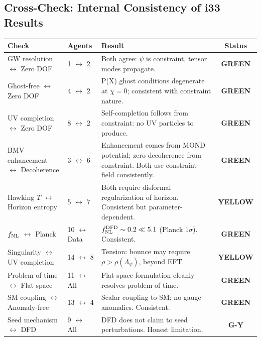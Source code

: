 \documentclass[11pt,a4paper]{article}
\newcommand{\GREEN}{\textcolor{dfdgreen}{\textbf{GREEN}}}
\newcommand{\YELLOW}{\textcolor{dfdyellow}{\textbf{YELLOW}}}
\newcommand{\GY}{\textcolor{dfdgy}{\textbf{G-Y}}}
\begin{document}
\subsection{Cross-Check: Internal Consistency of i33 Results}

\begin{center}
\begin{longtable}{p{3cm}p{2.5cm}p{5cm}c}
\toprule
\textbf{Check} & \textbf{Agents} & \textbf{Result} & \textbf{Status} \\
\midrule
\endfirsthead
GW resolution $\leftrightarrow$ Zero DOF & 1 $\leftrightarrow$ 2 & Both agree: $\psi$ is constraint, tensor modes propagate. & \GREEN \\
Ghost-free $\leftrightarrow$ Zero DOF & 4 $\leftrightarrow$ 2 & P(X) ghost conditions degenerate at $\chi=0$; consistent with constraint nature. & \GREEN \\
UV completion $\leftrightarrow$ Zero DOF & 8 $\leftrightarrow$ 2 & Self-completion follows from constraint: no UV particles to produce. & \GREEN \\
BMV enhancement $\leftrightarrow$ Decoherence & 3 $\leftrightarrow$ 6 & Enhancement comes from MOND potential; zero decoherence from constraint. Both use constraint-field consistently. & \GREEN \\
Hawking $T$ $\leftrightarrow$ Horizon entropy & 5 $\leftrightarrow$ 7 & Both require disformal regularization of horizon. Consistent but parameter-dependent. & \YELLOW \\
$f_{\rm NL}$ $\leftrightarrow$ Planck & 10 $\leftrightarrow$ Data & $f_{\rm NL}^{\rm DFD} \sim 0.2 \ll 5.1$ (Planck $1\sigma$). Consistent. & \GREEN \\
Singularity $\leftrightarrow$ UV completion & 14 $\leftrightarrow$ 8 & Tension: bounce may require $\rho > \rho(\Lambda_\psi)$, beyond EFT. & \YELLOW \\
Problem of time $\leftrightarrow$ Flat space & 11 $\leftrightarrow$ All & Flat-space formulation cleanly resolves problem of time. & \GREEN \\
SM coupling $\leftrightarrow$ Anomaly-free & 13 $\leftrightarrow$ 4 & Scalar coupling to SM; no gauge anomalies. Consistent. & \GREEN \\
Seed mechanism $\leftrightarrow$ DFD & 9 $\leftrightarrow$ All & DFD does not claim to seed perturbations. Honest limitation. & \GY \\
\bottomrule
\end{longtable}
\end{center}
\end{document}
